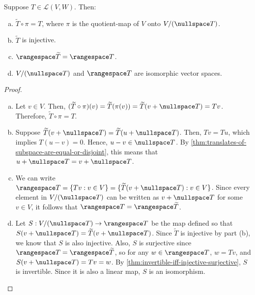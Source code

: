 \documentclass{article}
\begin{document}
\begin{theorem}
  \label{thm:null-space-and-range-of-widetilde-T}
  Suppose $T \in \mathcal{L}(V, W)$. Then:
  \begin{enumerate}[(a)]
  \item $\widetilde{T} \circ \pi = T$, where $\pi$ is the
    quotient-map of $V$ onto $V/(\nullspace T)$.
  \item $\widetilde{T}$ is injective.
  \item $\rangespace \widetilde{T} = \rangespace T$.
  \item $V/(\nullspace T)$ and $\rangespace T$ are isomorphic
    vector spaces.  
  \end{enumerate}
\end{theorem}  
\begin{proof}
  \leavevmode
  \begin{enumerate}[(a)]
    \item Let $v \in V$. Then, $(\widetilde{T} \circ \pi)(v) =
      \widetilde{T}(\pi(v)) = \widetilde{T}(v + \nullspace T) =
      Tv$. Therefore, $\widetilde T \circ \pi = T$.
    \item Suppose $\widetilde{T}(v + \nullspace T) = \widetilde{T}(u +
      \nullspace T)$. Then, $Tv = Tu$, which implies $T(u - v) =
      0$. Hence, $u - v \in \nullspace T$. By
      \cref{thm:translates-of-subspace-are-equal-or-disjoint}, this
      means that $u + \nullspace T = v + \nullspace T$.
    \item We can write $\rangespace T = \{Tv: v \in V\} = \{
      \widetilde{T}(v + \nullspace T): v \in V\}$. Since every element
      in $V/(\nullspace T)$ can be written as $v + \nullspace T$ for
      some $v \in V$, it follows that $\rangespace T = \rangespace
      \widetilde{T}$.
    \item Let $S: V/(\nullspace T) \rightarrow \rangespace T$ be the
      map defined so that $S(v + \nullspace T) = \widetilde{T}(v +
      \nullspace T)$. Since $\widetilde T$ is injective by part (b),
      we know that $S$ is also injective. Also, $S$ is surjective
      since $\rangespace T = \rangespace \widetilde{T}$, so for any $w
      \in \rangespace T$, $w = Tv$, and $S(v + \nullspace T) = Tv =
      w$. By \cref{thm:invertible-iff-injective-surjective}, $S$ is
      invertible. Since it is also a linear map, $S$ is an isomorphism.
      
  \end{enumerate}
\end{proof}
\end{document}
